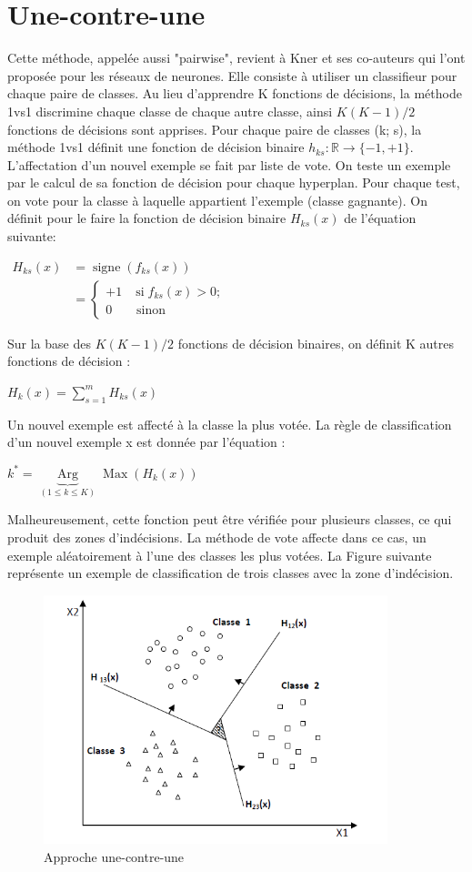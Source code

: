 \documentclass[12pt,a4paper]{report}
\begin{document}
\section{Une-contre-une}
Cette méthode, appelée aussi "pairwise", revient à Kner et ses co-auteurs qui l’ont
proposée pour les réseaux de neurones. Elle consiste à utiliser un classifieur pour chaque
paire de classes. Au lieu d’apprendre K fonctions de décisions, la méthode 1vs1 discrimine
chaque classe de chaque autre classe, ainsi $ K(K-1)/2 $ fonctions de décisions sont apprises.
Pour chaque paire de classes (k; s), la méthode 1vs1 définit une fonction de décision
binaire $ h_{ks} : \mathbb{R}\longrightarrow\{-1,+1\} $. L’affectation d’un nouvel exemple se fait par liste de vote.
On teste un exemple par le calcul de sa fonction de décision pour chaque hyperplan. Pour
chaque test, on vote pour la classe à laquelle appartient l’exemple (classe gagnante). On
définit pour le faire la fonction de décision binaire $ H_{ks}(x) $ de l’équation suivante:
\begin{center}
	$\begin{aligned} H_{k s}(x) & =\operatorname{signe}\left(f_{k s}(x)\right) \\ & = \begin{cases}+1 & \operatorname{si} f_{k s}(x)>0 ; \\ 0 & \text { sinon }\end{cases} \end{aligned}$
\end{center}
Sur la base des $ K(K-1)/2 $ fonctions de décision binaires, on définit K autres fonctions
de décision :\begin{center}
$ 	H_{k}(x) =\sum_{s=1}^{m}H_{ks}(x) $
\end{center}
Un nouvel exemple est affecté à la classe la plus votée. La règle de classification d’un
nouvel exemple x est donnée par l’équation :
\begin{center}
	$k^*=\underbrace{\operatorname{Arg}}_{(1 \leq k \leq K)} \operatorname{Max}\left(H_k(x)\right)$
\end{center}
Malheureusement, cette fonction peut être vérifiée pour plusieurs classes, ce qui produit
des zones d’indécisions. La méthode de vote affecte dans ce cas, un exemple aléatoirement
à l’une des classes les plus votées.
La Figure suivante représente un exemple de classification de trois classes avec la zone
d’indécision.
\begin{figure}[!ht]
	\centering
	\includegraphics[width=10cm]{images/capt6}
	\caption{Approche une-contre-une}
\end{figure}
\end{document}
